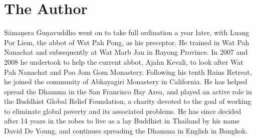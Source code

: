 \dividerRule

\section{The Author}

Sāmaṇera Guṇavuddho went on to take full ordination a year
later, with Luang Por Liem, the abbot of Wat Pah Pong, as his preceptor. 
He trained in Wat Pah Nanachat and subsequently at Wat Marb Jan in
Rayong Province. In 2007 and 2008 he undertook to help the current
abbot, Ajahn Kevalī, to look after Wat Pah Nanachat and Poo Jom Gom
Monastery. Following his tenth Rains Retreat, he joined the community of
Abhayagiri Monastery in California. He has helped spread the Dhamma in
the San Francisco Bay Area, and played an active role in the Buddhist
Global Relief Foundation, a charity devoted to the goal of working to
eliminate global poverty and its associated problems. He has since
decided after 14 years in the robes to live as a lay Buddhist in
Thailand by his name David De Young, and continues spreading the Dhamma
in English in Bangkok.

